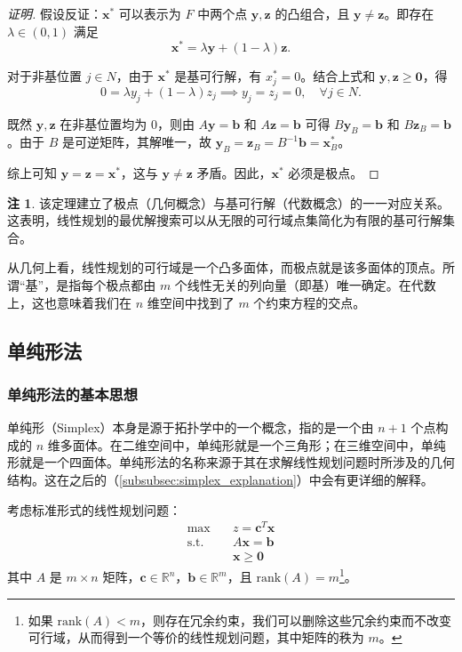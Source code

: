 \documentclass[12pt]{article}
\theoremstyle{plain}
\theoremstyle{definition}
\newtheorem{rmk}{注}[subsection]
\newenvironment{prf}[1][证明]{\begin{proof}[#1]}{\end{proof}}
\newcommand{\R}{\mathbb{R}}
\newcommand{\st}{\mathrel{\text{s.t.}}}
\newcommand{\rank}{\mathrm{rank}}
\begin{document}
\begin{prf}
    假设反证：$\bm{x}^*$ 可以表示为 $F$ 中两个点 $\bm{y}, \bm{z}$ 的凸组合，且 $\bm{y} \neq \bm{z}$。即存在 $\lambda \in (0,1)$ 满足
    \[ \bm{x}^* = \lambda \bm{y} + (1-\lambda) \bm{z}. \]
    
    对于非基位置 $j \in N$，由于 $\bm{x}^*$ 是基可行解，有 $x^*_j = 0$。结合上式和 $\bm{y}, \bm{z} \geq \bm{0}$，得
    \[ 0 = \lambda y_j + (1-\lambda) z_j \implies y_j = z_j = 0, \quad \forall j \in N. \]
    
    既然 $\bm{y}, \bm{z}$ 在非基位置均为 $0$，则由 $A\bm{y} = \bm{b}$ 和 $A\bm{z} = \bm{b}$ 可得 $B\bm{y}_B = \bm{b}$ 和 $B\bm{z}_B = \bm{b}$。由于 $B$ 是可逆矩阵，其解唯一，故 $\bm{y}_B = \bm{z}_B = B^{-1}\bm{b} = \bm{x}^*_B$。
    
    综上可知 $\bm{y} = \bm{z} = \bm{x}^*$，这与 $\bm{y} \neq \bm{z}$ 矛盾。因此，$\bm{x}^*$ 必须是极点。
\end{prf}

\begin{rmk}
    该定理建立了极点（几何概念）与基可行解（代数概念）的一一对应关系。这表明，线性规划的最优解搜索可以从无限的可行域点集简化为有限的基可行解集合。
    
    从几何上看，线性规划的可行域是一个凸多面体，而极点就是该多面体的顶点。所谓“基”，是指每个极点都由 $m$ 个线性无关的列向量（即基）唯一确定。在代数上，这也意味着我们在 $n$ 维空间中找到了 $m$ 个约束方程的交点。
\end{rmk}

\subsection{单纯形法}\label{subsec:simplex}

\subsubsection{单纯形法的基本思想}\label{subsubsec:simplex_idea}

单纯形（Simplex）本身是源于拓扑学中的一个概念，指的是一个由 $n+1$ 个点构成的 $n$ 维多面体。在二维空间中，单纯形就是一个三角形；在三维空间中，单纯形就是一个四面体。单纯形法的名称来源于其在求解线性规划问题时所涉及的几何结构。这在之后的（\ref{subsubsec:simplex_explanation}）中会有更详细的解释。

考虑标准形式的线性规划问题：
\begin{align*}
    \max \quad & z = \bm{c}^T \bm{x} \\
    \st \quad & A\bm{x} = \bm{b} \\
    & \bm{x} \geq \bm{0}
\end{align*}
其中 $A$ 是 $m \times n$ 矩阵，$\bm{c} \in \R^n$，$\bm{b} \in \R^m$，且 $\rank(A) = m$\footnote{如果 $\rank(A) < m$，则存在冗余约束，我们可以删除这些冗余约束而不改变可行域，从而得到一个等价的线性规划问题，其中矩阵的秩为 $m$。}。
\end{document}
